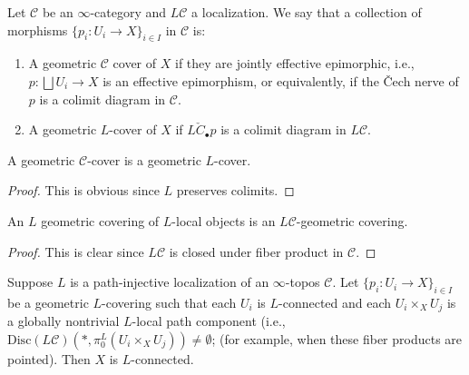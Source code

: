 \begin{defn} 
Let $\mathcal{C}$ be an $\infty$-category and $L\mathcal{C}$ a localization. We say that a collection of morphisms $\{p_i:U_i\to X\}_{i\in I}$ in $\mathcal{C}$ is:
    \begin{enumerate}
        \item A geometric $\mathcal{C}$ cover of $X$ if they are jointly effective epimorphic, i.e., $p:\bigsqcup U_i\to X$ is an effective epimorphism, or equivalently, if the \v Cech nerve of $p$ is a colimit diagram in $\mathcal{C}$.
        \item A geometric $L$-cover of $X$ if $L\check{C}_\bullet p$ is a colimit diagram in $L\mathcal{C}$.
    \end{enumerate}
\end{defn} 
\begin{lem}
    A geometric $\mathcal{C}$-cover is a geometric $L$-cover.
\end{lem}
\begin{proof}
This is obvious since $L$ preserves colimits. 
\end{proof}
\begin{lem}
    An $L$ geometric covering of $L$-local objects is an $L\mathcal{C}$-geometric covering. 
\end{lem}
\begin{proof}
    This is clear since $L\mathcal{C}$ is closed under fiber product in $\mathcal{C}$.
\end{proof}
\begin{lem}\label{L geom L connectivity}
Suppose $L$ is a path-injective localization of an $\infty$-topos $\mathcal{C}$. Let $\{p_i:U_i\to X\}_{i\in I}$ be a geometric $L$-covering such that each $U_i$ is $L$-connected and each $U_i\times_XU_j$ is a globally nontrivial $L$-local path component (i.e., $\mathrm{Disc}(L\mathcal{C})(*,\pi_0^L(U_i\times_XU_j))\neq \emptyset$; (for example, when these fiber products are pointed). Then $X$ is $L$-connected.
\end{lem}

